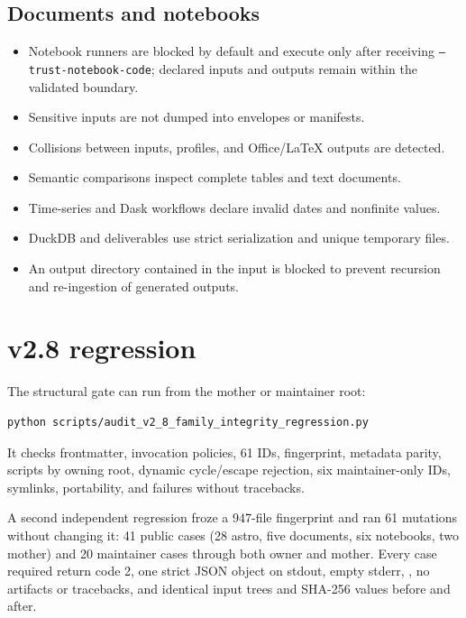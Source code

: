 \documentclass[11pt,a4paper]{article}
\newcommand{\code}[1]{\texttt{\detokenize{#1}}}
\begin{document}
\subsection{Documents and notebooks}
\begin{itemize}[leftmargin=1.5em]
\item Notebook runners are blocked by default and execute only after receiving \texttt{--trust-notebook-\allowbreak code}; declared inputs and outputs remain within the validated boundary.
\item Sensitive inputs are not dumped into envelopes or manifests.
\item Collisions between inputs, profiles, and Office/LaTeX outputs are detected.
\item Semantic comparisons inspect complete tables and text documents.
\item Time-series and Dask workflows declare invalid dates and nonfinite values.
\item DuckDB and deliverables use strict serialization and unique temporary files.
\item An output directory contained in the input is blocked to prevent recursion and re-ingestion of generated outputs.
\end{itemize}

\section{v2.8 regression}

The structural gate can run from the mother or maintainer root:
\begin{lstlisting}[style=promptstyle]
python scripts/audit_v2_8_family_integrity_regression.py
\end{lstlisting}

It checks frontmatter, invocation policies, 61 IDs, fingerprint, metadata parity,
scripts by owning root, dynamic cycle/escape rejection, six maintainer-only IDs,
symlinks, portability, and failures without tracebacks.

A second independent regression froze a 947-file fingerprint and ran 61 mutations
without changing it: 41 public cases (28 astro, five documents, six notebooks,
two mother) and 20 maintainer cases through both owner and mother. Every case
required return code 2, one strict JSON object on stdout, empty stderr,
\code{BLOCKED_CONTROLADO}, no artifacts or tracebacks, and identical input trees
and SHA-256 values before and after.
\end{document}
